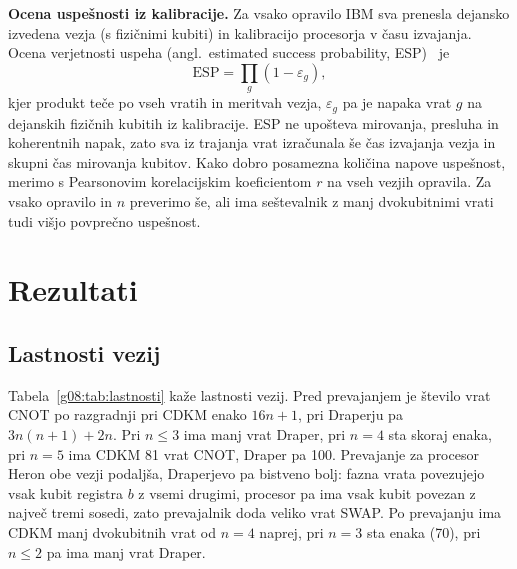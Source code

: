 \smallskip\noindent\textbf{Ocena uspešnosti iz kalibracije.} Za vsako opravilo IBM sva prenesla dejansko izvedena vezja (s fizičnimi kubiti) in kalibracijo procesorja v času izvajanja. Ocena verjetnosti uspeha (angl.\ estimated success probability, ESP)~\cite{g08:nishio2020} je
\begin{equation}
\mathrm{ESP} = \prod_{g} (1 - \varepsilon_g),
\label{g08:eq:esp}
\end{equation}
kjer produkt teče po vseh vratih in meritvah vezja, $\varepsilon_g$ pa je napaka vrat $g$ na dejanskih fizičnih kubitih iz kalibracije. ESP ne upošteva mirovanja, presluha in koherentnih napak, zato sva iz trajanja vrat izračunala še čas izvajanja vezja in skupni čas mirovanja kubitov. Kako dobro posamezna količina napove uspešnost, merimo s Pearsonovim korelacijskim koeficientom $r$ na vseh vezjih opravila. Za vsako opravilo in $n$ preverimo še, ali ima seštevalnik z manj dvokubitnimi vrati tudi višjo povprečno uspešnost.


\section{Rezultati}
\label{g08:sec:rezultati}

\subsection{Lastnosti vezij}
\label{g08:sec:lastnosti}

Tabela~\ref{g08:tab:lastnosti} kaže lastnosti vezij. Pred prevajanjem je število vrat CNOT po razgradnji pri CDKM enako $16n+1$, pri Draperju pa $3n(n+1)+2n$. Pri $n \le 3$ ima manj vrat Draper, pri $n = 4$ sta skoraj enaka, pri $n = 5$ ima CDKM 81 vrat CNOT, Draper pa 100. Prevajanje za procesor Heron obe vezji podaljša, Draperjevo pa bistveno bolj: fazna vrata povezujejo vsak kubit registra $b$ z vsemi drugimi, procesor pa ima vsak kubit povezan z največ tremi sosedi, zato prevajalnik doda veliko vrat SWAP. Po prevajanju ima CDKM manj dvokubitnih vrat od $n = 4$ naprej, pri $n = 3$ sta enaka (70), pri $n \le 2$ pa ima manj vrat Draper.

